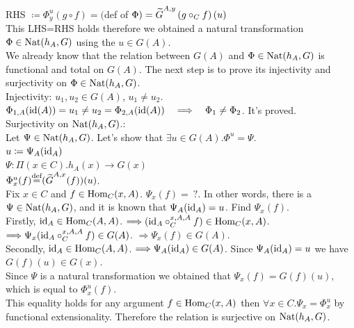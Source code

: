 \documentclass[10pt,a4paper]{article}
\begin{document}
RHS $\coloneqq \Phi^u_y(g\circ f)=($def of $\Phi)={\widetilde{G}\textrm{}}^{A,y}\left(g\circ_C f\right)(u)$\\
This LHS=RHS holds therefore we obtained a natural transformation $\Phi\in{\textrm{Nat}}(h_A,G)$ using the $u\in G(A)$.\\
We already know that the relation between $G(A)$ and $\Phi\in{\textrm{Nat}}(h_A,G)$ is functional and total on $G(A)$.
The next step is to prove its injectivity and surjectivity on $\Phi\in{\textrm{Nat}}(h_A,G)$.\\
Injectivity: $u_1,u_2\in G(A)$, $u_1\neq u_2$.\\
$\Phi_{1,A}({\textrm{id}}(A))= u_1\neq u_2 = \Phi_{2,A}({\textrm{id}}(A))\quad \Longrightarrow \quad \Phi_1 \neq \Phi_2$. It's proved. \\
Surjectivity on ${\textrm{Nat}}(h_A,G)$.:\\
Let $\Psi\in{\textrm{Nat}}(h_A,G)$. Let's show that $\exists u\in G(A).\Phi^u=\Psi$.\\
$u\coloneqq \Psi_A({\textrm{id}}_A)$\\
$\Psi:\Pi(x\in C). h_A(x)\to G(x)$\\
$\Phi^u_x(f) {\stackrel{{\textrm{def}}}{=}} ({\widetilde{G}\textrm{}}^{A,x}(f))(u)$.\\
Fix $x\in C$ and $f\in{\textrm{Hom}}_C(x,A)$. $\Psi_x(f)=\ ?$.
In other words, there is a $\Psi\in{\textrm{Nat}}(h_A,G)$, and it is known that $\Psi_A({\textrm{id}}_A) = u$. Find $\Psi_x(f)$.\\
Firstly, ${\textrm{id}}_A \in {\textrm{Hom}}_C(A,A)$. $\Longrightarrow ({\textrm{id}}_A \circ_C^{x,A,A} f) \in {\textrm{Hom}}_C(x,A)$. $\Longrightarrow \Psi_x({\textrm{id}}_A \circ_C^{x,A,A} f)\in G(A)$. $\Longrightarrow \Psi_x(f)\in G(A)$.\\
Secondly, ${\textrm{id}}_A \in {\textrm{Hom}}_C(A,A)$. $\Longrightarrow \Psi_A({\textrm{id}}_A) \in G(A)$. Since $\Psi_A({\textrm{id}}_A)=u$ we have $G(f)(u)\in G(x)$.\\
Since $\Psi$ is a natural transformation we obtained that $\Psi_x(f)=G(f)(u),$ which is equal to $\Phi^u_x(f)$.\\
This equality holds for any argument $f\in {\textrm{Hom}}_C(x,A)$ then $\forall x\in C. \Psi_x=\Phi^u_x$ by functional extensionality. Therefore the relation is surjective on ${\textrm{Nat}}(h_A,G)$.
\myqed\\
\end{document}
